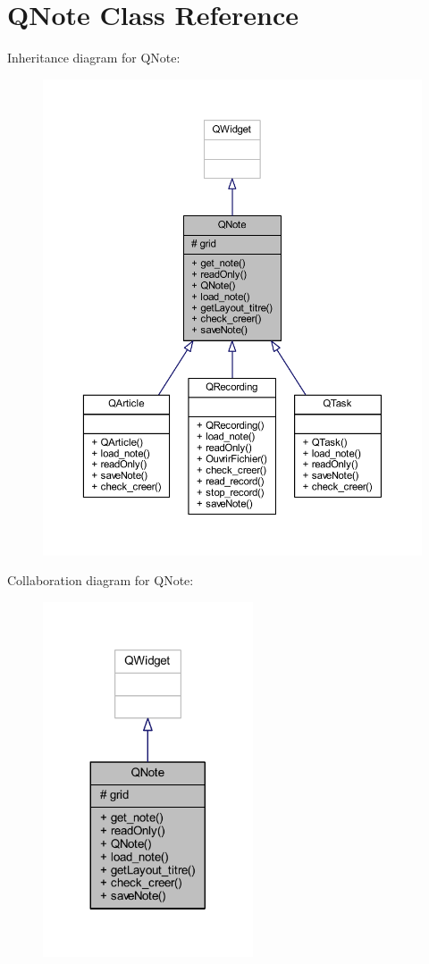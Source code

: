 \hypertarget{class_q_note}{}\section{Q\+Note Class Reference}
\label{class_q_note}


Inheritance diagram for Q\+Note\+:\nopagebreak
\begin{figure}[H]
\begin{center}
\leavevmode
\includegraphics[width=350pt]{class_q_note__inherit__graph}
\end{center}
\end{figure}


Collaboration diagram for Q\+Note\+:\nopagebreak
\begin{figure}[H]
\begin{center}
\leavevmode
\includegraphics[width=176pt]{class_q_note__coll__graph}
\end{center}
\end{figure}
